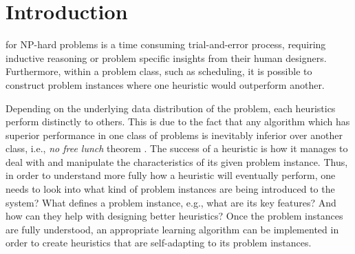 
\chapter{Introduction}\label{ch:introduction} 

 for NP-hard problems is a time 
consuming trial-and-error process, requiring inductive reasoning or problem 
specific insights from their human designers. Furthermore, within a problem 
class, such as scheduling, it is possible to construct problem instances where 
one heuristic would outperform another. 

Depending on the underlying data distribution of the problem, each heuristics 
perform distinctly to others. This is due to the fact that any algorithm which 
has superior performance in one class of problems is inevitably inferior over 
another class, i.e., \emph{no free lunch} theorem \citep{Wolpert97nofree}. 
The success of a heuristic is how it manages to deal with and manipulate the 
characteristics of its given problem instance. Thus, in order to understand 
more fully how a heuristic will eventually perform, one needs to look into what 
kind of problem instances are being introduced to the system? What defines a 
problem instance, e.g., what are its key features? And how can they help with 
designing better heuristics? Once the problem instances are fully understood, 
an appropriate learning algorithm can be implemented in order to create 
heuristics that are  self-adapting to its problem instances.


